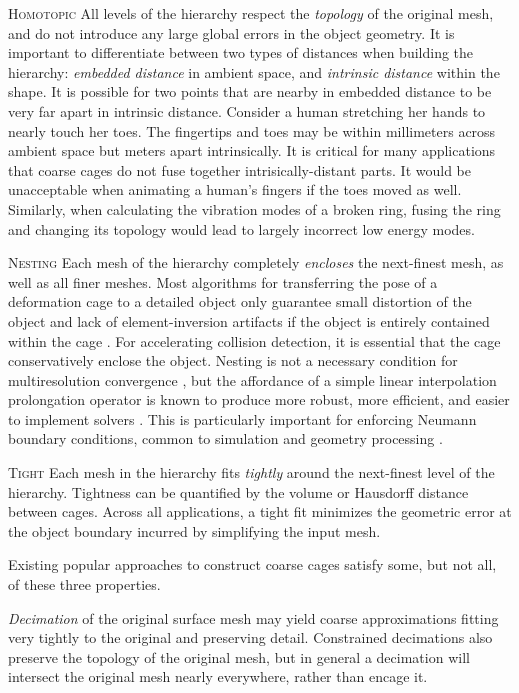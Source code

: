 \noindent \textsc{Homotopic} All levels of the hierarchy respect the
\emph{topology} of the original mesh, and do not introduce any large global
errors in the object geometry. It is important to differentiate between two
types of distances when building the hierarchy: \emph{embedded distance} in
ambient space, and \emph{intrinsic distance} within the shape.
%
It is possible for two points that are nearby in embedded distance to be very
far apart in intrinsic distance. Consider a human stretching her hands to
nearly touch her toes. The fingertips and toes may be within millimeters across
ambient space but meters apart intrinsically.
%
It is critical for many applications that coarse cages do not fuse together
intrisically-distant parts. It would be unacceptable when animating a 
human's fingers if the toes moved as well.
%
Similarly, when calculating the vibration modes of a broken ring, fusing the
ring and changing its topology would lead to largely incorrect low energy
modes.

\noindent \textsc{Nesting}
%
Each mesh of the hierarchy completely \emph{encloses} the next-finest mesh, as
well as all finer meshes.
%
Most algorithms for transferring the pose of a deformation cage to a detailed
object only guarantee small distortion of the object and lack of
element-inversion artifacts if the object is entirely contained within the cage
\cite{HarmonicCoodinates07,Ben-Chen:2009:VHM}.
%
For accelerating collision detection, it is essential that the cage
conservatively enclose the object.
%
Nesting is not a necessary condition for multiresolution convergence
\cite{Chan96overlappingschwarz}, but the affordance of a simple linear
interpolation prolongation operator is known to produce more robust, more
efficient, and easier to implement solvers
\cite{chan2000robust,dickopf2010multilevel}.
%
This is particularly important for enforcing Neumann boundary conditions,
common to simulation and geometry processing \cite{chan1999boundary}.

\noindent \textsc{Tight}
%
Each mesh in the hierarchy fits \emph{tightly} around the next-finest level of
the hierarchy.
%
Tightness can be quantified by the volume or Hausdorff distance between cages.
%
Across all applications, a tight fit minimizes the geometric error at the
object boundary incurred by simplifying the input mesh.

Existing popular approaches to construct coarse cages satisfy some, but not
all, of these three properties.

\emph{Decimation} of the original surface mesh may yield coarse
approximations fitting very tightly to the original and preserving detail.
%
Constrained decimations also preserve the topology of the original mesh, but in
general a decimation will intersect the original mesh nearly everywhere, rather
than encage it.

